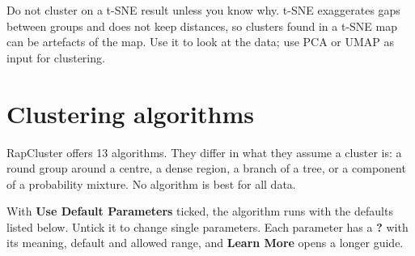 \documentclass[11pt,a4paper]{article}
\newcommand{\ui}[1]{\textsf{\textbf{#1}}}   %
\begin{document}
\begin{note}
Do not cluster on a t-SNE result unless you know why. t-SNE exaggerates gaps between groups and does not keep
distances, so clusters found in a t-SNE map can be artefacts of the map. Use it to look at the data; use PCA or UMAP
as input for clustering.
\end{note}

\section{Clustering algorithms}

RapCluster offers 13 algorithms. They differ in what they assume a cluster is: a round group around a centre, a
dense region, a branch of a tree, or a component of a probability mixture. No algorithm is best for all data.

With \ui{Use Default Parameters} ticked, the algorithm runs with the defaults listed below. Untick it to change
single parameters. Each parameter has a \ui{?} with its meaning, default and allowed range, and \ui{Learn More} opens
a longer guide.
\end{document}
